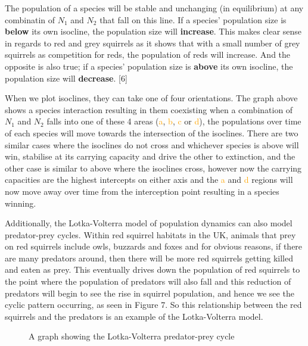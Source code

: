 \documentclass{article}
\begin{document}
The population of a species will be stable and unchanging (in equilibrium) at any combinatin of $N_{1}$ and $N_{2}$ that fall on this line. If a species' population size is \textbf{below} its own isocline, the population size will \textbf{increase}. This makes clear sense in regards to red and grey squirrels as it shows that with a small number of grey squirrels as competition for reds, the population of reds will increase. And the opposite is also true; if a species' population size is \textbf{above} its own isocline, the population size will \textbf{decrease}. [6]

When we plot isoclines, they can take one of four orientations. The graph above shows a species interaction resulting in them coexisting  when a combination of $N_{1}$ and $N_{2}$ falls into one of these 4 areas (\textcolor{orange}{a}, \textcolor{orange}{b}, \textcolor{orange}{c} or \textcolor{orange}{d}), the populations over time of each species will move towards the intersection of the isoclines. There are two similar cases where the isoclines do not cross and whichever species is above will win, stabilise at its carrying capacity and drive the other to extinction, and the other case is similar to above where the isoclines cross, however now the carrying capacities are the highest intercepts on either axis and the \textcolor{orange}{a} and \textcolor{orange}{d} regions will now move away over time from the interception point resulting in a species winning. 

Additionally, the Lotka-Volterra model of population dynamics can also model predator-prey cycles. Within red squirrel habitats in the UK, animals that prey on red squirrels include owls, buzzards and foxes and for obvious reasons, if there are many predators around, then there will be more red squirrels getting killed and eaten as prey. This eventually drives down the population of red squirrels to the point where the population of predators will also fall and this reduction of predators will begin to see the rise in squirrel population, and hence we see the cyclic pattern occurring, as seen in Figure 7. So this relationship between the red squirrels and the predators is an example of the Lotka-Volterra model. 

\begin{figure}[H]
\begin{center}
\caption{A graph showing the Lotka-Volterra predator-prey cycle}
\end{center}
\end{figure}
\end{document}
